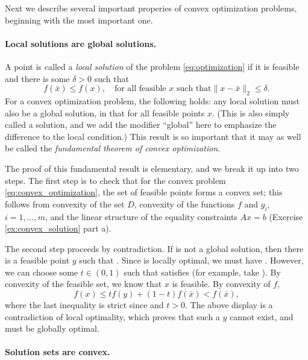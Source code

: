 Next we describe several important properies of convex optimization problems,
beginning with the most important one.

\paragraph{Local solutions are global solutions.} 

A point  is called a \emph{local solution} of the problem
\eqref{eq:optimization} if it is feasible and there is some $\delta>0$ such that 
\[
f(\bar{x}) \leq f(x), \quad \text{for all feasible $x$ such that
$\|x - \bar{x}\|_2 \leq \delta$}.
\]
For a convex optimization problem, the following holds: any local solution
 must also be a global solution, in that  for all feasible points $x$. (This is also simply called a
solution, and we add the modifier ``global'' here to emphasize the difference to
the local condition.) This result is so important that it may as well be called
the \emph{fundamental theorem of convex optimization}. 

The proof of this fundamental result is elementary, and we break it up into two
steps. The first step is to check that for the convex problem
\eqref{eq:convex_optimization}, the set of feasible points forms a convex set;
this follows from convexity of the set $D$, convexity of the functions $f$ and 
$g_i$, $i=1,\dots,m$, and the linear structure of the equality constraints 
$Ax=b$ (Exercise \ref{ex:convex_solution} part a).  

The second step proceeds by contradiction. If  is not a global
solution, then there is a feasible point $y$ such that . Since  is locally optimal, we must have
. However, we can choose some $t \in (0,1)$ 
such that  satisfies  (for example, take ).
By convexity of the feasible set, we know that $x$ is feasible. By convexity of
$f$,  
\[
f(x) \leq t f(y) + (1-t) f(\bar{x}) < f(\bar{x}),
\]
where the last inequality is strict since  and
$t>0$. The above display is a contradiction of local optimality, which proves
that such a $y$ cannot exist, and  must be globally optimal. 

\paragraph{Solution sets are convex.} 

